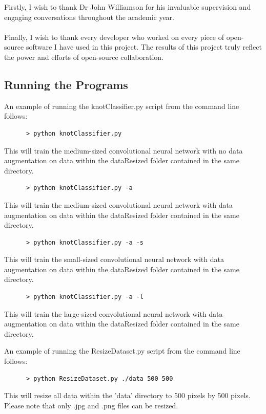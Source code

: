 \documentclass{l4proj}
\begin{document}
Firstly, I wish to thank Dr John Williamson for his invaluable supervision and engaging conversations throughout the academic year.
\\\\
Finally, I wish to thank every developer who worked on every piece of open-source software I have used in this project.
The results of this project truly reflect the power and efforts of open-source collaboration. 


\begin{appendices}

\chapter{Running the Programs}
An example of running the knotClassifier.py script from the command line follows:
\begin{verbatim}
      > python knotClassifier.py
\end{verbatim}
This will train the medium-sized convolutional neural network with no data augmentation on data within the dataResized folder contained in the same directory.
\begin{verbatim}
      > python knotClassifier.py -a
\end{verbatim}
This will train the medium-sized convolutional neural network with data augmentation on data within the dataResized folder contained in the same directory.
\begin{verbatim}
      > python knotClassifier.py -a -s
\end{verbatim}
This will train the small-sized convolutional neural network with data augmentation on data within the dataResized folder contained in the same directory.
\begin{verbatim}
      > python knotClassifier.py -a -l
\end{verbatim}
This will train the large-sized convolutional neural network with data augmentation on data within the dataResized folder contained in the same directory.

An example of running the ResizeDataset.py script from the command line follows:
\begin{verbatim}
      > python ResizeDataset.py ./data 500 500
\end{verbatim}
This will resize all data within the 'data' directory to 500 pixels by 500 pixels. Please note that only .jpg and .png files can be resized.


\end{appendices}
\end{document}
